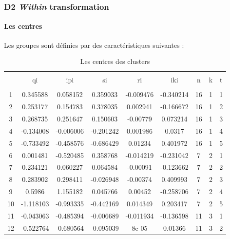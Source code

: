 \documentclass[11pt,]{article}
\let\oldparagraph\paragraph
\renewcommand{\paragraph}[1]{\oldparagraph{#1}\mbox{}}
\begin{document}
\FloatBarrier

\hypertarget{d2-within-transformation}{%
\subsubsection{\texorpdfstring{D2 \emph{Within}
transformation}{D2 Within transformation}}\label{d2-within-transformation}}

\hypertarget{les-centres}{%
\paragraph{Les centres}\label{les-centres}}

Les groupes sont définies par des caractéristiques suivantes :

\FloatBarrier

\begin{table}[!htbp] \centering 
  \caption{Les centres des clusters} 
  \label{} 
\begin{tabular}{@{\extracolsep{5pt}} ccccccccc} 
\\[-1.8ex]\hline 
\hline \\[-1.8ex] 
 & qi & ipi & si & ri & iki & n & k & t \\ 
\hline \\[-1.8ex] 
1 & 0.345588 & 0.058152 & 0.359033 & -0.009476 & -0.340214 & 16 & 1 & 1 \\ 
2 & 0.253177 & 0.154783 & 0.378035 & 0.002941 & -0.166672 & 16 & 1 & 2 \\ 
3 & 0.268735 & 0.251647 & 0.150603 & -0.00779 & 0.073214 & 16 & 1 & 3 \\ 
4 & -0.134008 & -0.006006 & -0.201242 & 0.001986 & 0.0317 & 16 & 1 & 4 \\ 
5 & -0.733492 & -0.458576 & -0.686429 & 0.01234 & 0.401972 & 16 & 1 & 5 \\ 
6 & 0.001481 & -0.520485 & 0.358768 & -0.014219 & -0.231042 & 7 & 2 & 1 \\ 
7 & 0.234121 & 0.060227 & 0.064584 & -0.00091 & -0.123662 & 7 & 2 & 2 \\ 
8 & 0.283902 & 0.298411 & -0.026948 & -0.00374 & 0.409993 & 7 & 2 & 3 \\ 
9 & 0.5986 & 1.155182 & 0.045766 & 0.00452 & -0.258706 & 7 & 2 & 4 \\ 
10 & -1.118103 & -0.993335 & -0.442169 & 0.014349 & 0.203417 & 7 & 2 & 5 \\ 
11 & -0.043063 & -0.485394 & -0.006689 & -0.011934 & -0.136598 & 11 & 3 & 1 \\ 
12 & -0.522764 & -0.680564 & -0.095039 & 8e-05 & 0.01366 & 11 & 3 & 2 \\ 

\end{tabular}
\end{table}
\end{document}
